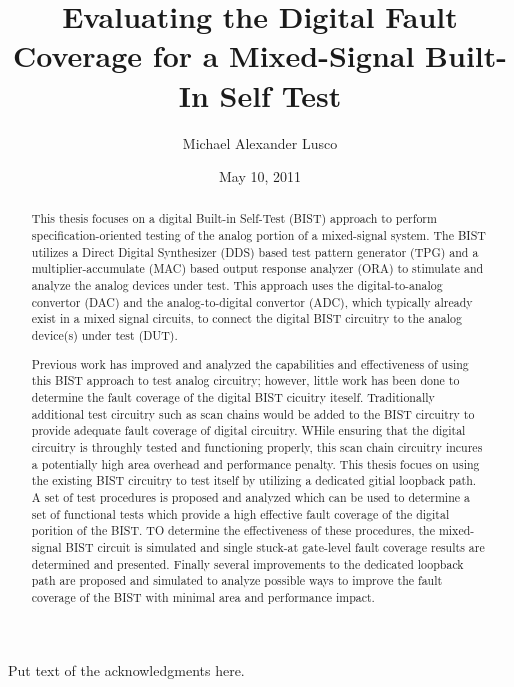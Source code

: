 \documentclass[12pt]{report}
\title{Evaluating the Digital Fault Coverage for a Mixed-Signal Built-In Self Test}
\author{Michael Alexander Lusco}
\date{May 10, 2011} %
\begin{document}
\begin{romanpages}      %

\TitlePage 

\begin{abstract}
This thesis focuses on a digital Built-in Self-Test (BIST) approach to perform specification-oriented testing of the analog portion of a mixed-signal system.  The BIST utilizes a Direct Digital Synthesizer (DDS) based test pattern generator (TPG) and a multiplier-accumulate (MAC) based output response analyzer (ORA) to stimulate and analyze the analog devices under test.  This approach uses the digital-to-analog convertor (DAC) and the analog-to-digital convertor (ADC), which typically already exist in a mixed signal circuits, to connect the digital BIST circuitry to the analog device(s) under test (DUT).

Previous work has improved and analyzed the capabilities and effectiveness of using this BIST approach to test analog circuitry; however, little work has been done to determine the fault coverage of the digital BIST cicuitry iteself.  Traditionally additional test circuitry such as scan chains would be added to the BIST circuitry to provide adequate fault coverage of digital circuitry.  WHile ensuring that the digital circuitry is throughly tested and functioning properly, this scan chain circuitry incures a potentially high area overhead and performance penalty.  This thesis focues on using the existing BIST circuitry to test itself by utilizing a dedicated gitial loopback path.  A set of test procedures is proposed and analyzed which can be used to determine a set of functional tests which provide a high effective fault coverage of the digital porition of the BIST.  TO determine the effectiveness of these procedures, the mixed-signal BIST circuit is simulated and single stuck-at gate-level fault coverage results are determined and presented.  Finally several improvements to the dedicated loopback path are proposed and simulated to analyze possible ways to improve the fault coverage of the BIST with minimal area and performance impact.
\end{abstract}

\begin{acknowledgments}
Put text of the acknowledgments here.
\end{acknowledgments}

\tableofcontents
\listoffigures
\listoftables

\printnomenclature[0.5in] %
\end{romanpages}        %
\end{document}
